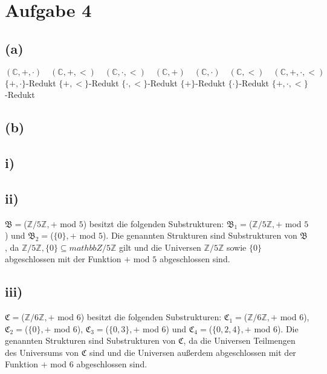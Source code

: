 \documentclass[11pt, a4paper]{article}
\begin{document}
\section*{Aufgabe 4}
\subsection*{(a)}
$(\mathbb{C}, +, \cdot) \quad (\mathbb{C}, +, <) \quad (\mathbb{C}, \cdot, <) \quad (\mathbb{C}, +) \quad (\mathbb{C}, \cdot) \quad (\mathbb{C}, <) \quad (\mathbb{C}, +, \cdot, <)$\\
$\{+, \cdot\}$-Redukt $\{+, <\}$-Redukt $\{\cdot, <\}$-Redukt $\{+\}$-Redukt $\{\cdot\}$-Redukt $\{+, \cdot, <\}$-Redukt

\subsection*{(b)}
\subsection*{i)}

\subsection*{ii)}
$\mathfrak{B} = $($\mathbb{Z}/5\mathbb{Z},+$ mod $5$) besitzt die folgenden Substrukturen:\newline
$\mathfrak{B_1} = $($\mathbb{Z}/5\mathbb{Z},+$ mod $5$) und\newline
$\mathfrak{B_2} = $($\{0\},+$ mod $5$).\newline
Die genannten Strukturen sind Substrukturen von $\mathfrak{B}$, da $\mathbb{Z}/5\mathbb{Z}, \{0\}\subseteq mathbb{Z}/5\mathbb{Z}$ gilt und die Universen $\mathbb{Z}/5\mathbb{Z}$ sowie $\{0\}$ abgeschlossen mit der Funktion $+$ mod $5$ abgeschlossen sind.

\subsection*{iii)}
$\mathfrak{C} = $($\mathbb{Z}/6\mathbb{Z},+$ mod $6$) besitzt die folgenden Substrukturen:\newline
$\mathfrak{C_1} = $($\mathbb{Z}/6\mathbb{Z},+$ mod $6$),\newline
$\mathfrak{C_2} = $($\{0\},+$ mod $6$),\newline
$\mathfrak{C_3} = $($\{0,3\},+$ mod $6$) und\newline
$\mathfrak{C_4} = $($\{0,2,4\},+$ mod $6$).\newline
Die genannten Strukturen sind Substrukturen von $\mathfrak{C}$, da die Universen Teilmengen des Universums von $\mathfrak{C}$ sind und die Universen außerdem abgeschlossen mit der Funktion $+$ mod $6$ abgeschlossen sind.
\end{document}
